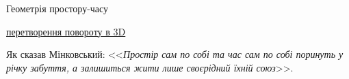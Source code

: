 \documentclass[]{beamer}
\begin{document}
\begin{frame}{Геометрія простору-часу}{}
\begin{overprint}
		\vfill

		{\tiny \href{https://uk.wikipedia.org/wiki/\%D0\%9C\%D0\%B0\%D1\%82\%D1\%80\%D0\%B8\%D1\%86\%D1\%8F_\%D0\%BF\%D0\%BE\%D0\%B2\%D0\%BE\%D1\%80\%D0\%BE\%D1\%82\%D1\%83}{перетворення повороту в 3D} }
		\onslide<3>
		\begin{block}{}\centering
			Як сказав Мінковський: <<\textit{Простір сам по собі та час сам по собі поринуть у річку забуття, а залишиться жити лише своєрідний їхній
				союз}>>.
		\end{block}
	\end{overprint}
\end{frame}




\end{document}
